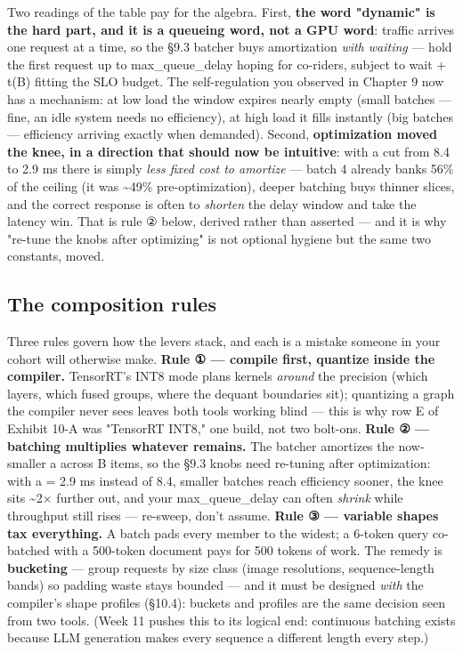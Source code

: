 Two readings of the table pay for the algebra. First, \textbf{the word "dynamic" is the hard part, and it is a queueing word, not a GPU word}: traffic arrives one request at a time, so the §9.3 batcher buys amortization \textit{with waiting} — hold the first request up to max\_queue\_delay hoping for co-riders, subject to wait + t(B) fitting the SLO budget. The self-regulation you observed in Chapter 9 now has a mechanism: at low load the window expires nearly empty (small batches — fine, an idle system needs no efficiency), at high load it fills instantly (big batches — efficiency arriving exactly when demanded). Second, \textbf{optimization moved the knee, in a direction that should now be intuitive}: with a cut from 8.4 to 2.9 ms there is simply \textit{less fixed cost to amortize} — batch 4 already banks 56\% of the ceiling (it was \textasciitilde{}49\% pre-optimization), deeper batching buys thinner slices, and the correct response is often to \textit{shorten} the delay window and take the latency win. That is rule ② below, derived rather than asserted — and it is why "re-tune the knobs after optimizing" is not optional hygiene but the same two constants, moved.

\subsection*{The composition rules}

Three rules govern how the levers stack, and each is a mistake someone in your cohort will otherwise make. \textbf{Rule ① — compile first, quantize inside the compiler.} TensorRT's INT8 mode plans kernels \textit{around} the precision (which layers, which fused groups, where the dequant boundaries sit); quantizing a graph the compiler never sees leaves both tools working blind — this is why row E of Exhibit 10-A was "TensorRT INT8," one build, not two bolt-ons. \textbf{Rule ② — batching multiplies whatever remains.} The batcher amortizes the now-smaller a across B items, so the §9.3 knobs need re-tuning after optimization: with a = 2.9 ms instead of 8.4, smaller batches reach efficiency sooner, the knee sits \textasciitilde{}2× further out, and your max\_queue\_delay can often \textit{shrink} while throughput still rises — re-sweep, don't assume. \textbf{Rule ③ — variable shapes tax everything.} A batch pads every member to the widest; a 6-token query co-batched with a 500-token document pays for 500 tokens of work. The remedy is \textbf{bucketing} — group requests by size class (image resolutions, sequence-length bands) so padding waste stays bounded — and it must be designed \textit{with} the compiler's shape profiles (§10.4): buckets and profiles are the same decision seen from two tools. (Week 11 pushes this to its logical end: continuous batching exists because LLM generation makes every sequence a different length every step.)

